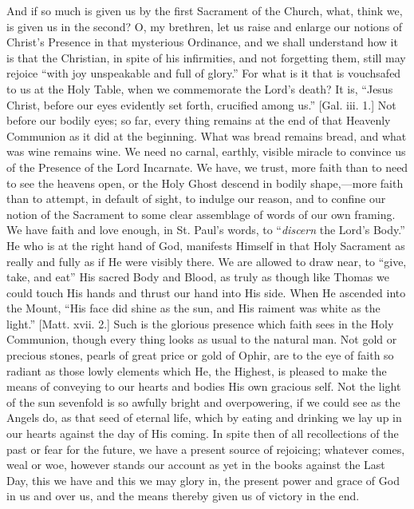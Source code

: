 And if so much is given us by the first Sacrament of the Church,
what, think we, is given us in the second? O, my brethren, let us
raise and enlarge our notions of Christ's Presence in that mysterious
Ordinance, and we shall understand how it is that the Christian, in
spite of his infirmities, and not forgetting them, still may rejoice
``with joy unspeakable and full of glory.'' For what is it
that is vouchsafed to us at the Holy Table, when we commemorate the
Lord's death? It is, ``Jesus Christ, before our eyes evidently set
forth, crucified among us.'' [Gal. iii. 1.] Not before our bodily
eyes; so far, every thing remains at the end of that Heavenly
Communion as it did at the beginning. What was bread remains bread,
and what was wine remains wine. We need no carnal, earthly, visible
miracle to convince us of the Presence of the Lord Incarnate. We have,
we trust, more faith than to need to see the heavens open, or the Holy
Ghost descend in bodily shape,—more faith than to attempt, in
default of sight, to indulge our reason, and to confine our notion of
the Sacrament to some clear assemblage of words of our own framing. We
have faith and love enough, in St. Paul's words, to ``\emph{discern}
the Lord's Body.'' He who is at the right hand of God, manifests
Himself in that Holy Sacrament as really and fully as if He were
visibly there. We are allowed to draw near, to ``give, take, and
eat'' His sacred Body and Blood, as truly as though like Thomas we
could touch His hands and thrust our hand into His side. When He
ascended into the Mount, ``His face did shine as the sun, and His
raiment was white as the light.'' [Matt. xvii. 2.] Such is the
glorious presence which faith sees in the Holy Communion, though every
thing looks as usual to the natural man. Not gold or precious stones,
pearls of great price or gold of Ophir, are to the eye of faith so
radiant as those lowly elements which He, the Highest, is pleased to
make the means of conveying to our hearts and bodies His own gracious
self. Not the light of the sun sevenfold is so awfully bright and
overpowering, if we could see as the Angels do, as that seed of
eternal life, which by eating and drinking we lay up in our hearts
against the day of His coming. In spite then of all recollections of
the past or fear for the future, we have a present source of
rejoicing; whatever comes, weal or woe, however stands our account as
yet in the books against the Last Day, this we have and this we may
glory in, the present power and grace of God in us and over us, and
the means thereby given us of victory in the end.

